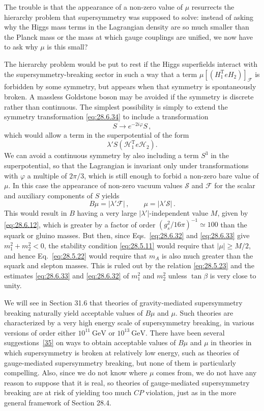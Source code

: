 The trouble is that the appearance of a non-zero value of \(\mu\)
resurrects the hierarchy problem that supersymmetry was supposed to solve:
instead of asking why the Higgs mass terms in the Lagrangian density are
so much smaller than the Planck mass or the mass at which gauge couplings
are unified, we now have to ask why \(\mu\) is this small?

The hierarchy problem would be put to rest if the Higgs superfields
interact with the supersymmetry-breaking sector in such a way that a term
\(\mu[(H_1^{\mathrm{T}}eH_2)]_{\mathcal{F}}\) is forbidden by some
symmetry, but appears when that symmetry is spontaneously broken. A
massless Goldstone boson may be avoided if the symmetry is discrete rather
than continuous. The simplest possibility is simply to extend the
symmetry transformation \eqref{eq:28.6.34} to include a transformation
\[
  S\longrightarrow e^{-2i\varphi}S\,,
\]
which would allow a term in the superpotential of the form
\[
  \lambda'S(\mathcal{H}_1^{\mathrm{T}}e\mathcal{H}_2).
\]
We can avoid a continuous symmetry by also including a term \(S^3\) in
the superpotential, so that the Lagrangian is invariant only under
transformations with \(\varphi\) a multiple of \(2\pi/3\), which is still
enough to forbid a non-zero bare value of \(\mu\). In this case the
appearance of non-zero vacuum values \(\mathcal{S}\) and \(\mathcal{F}\)
for the scalar and auxiliary components of \(S\) yields
\[
  B\mu=\lvert\lambda'\mathcal{F}\rvert\,,
  \qquad
  \mu=\lvert\lambda'\mathcal{S}\rvert\,.
\]
This would result in \(B\) having a very large
\(\lvert\lambda'\rvert\)-independent value \(M\), given by
\eqref{eq:28.6.12}, which is greater by a factor of order
\((g_s^2/16\pi)^{-1}\simeq100\) than the squark or gluino masses. But
then, since Eqs.~\eqref{eq:28.6.32} and \eqref{eq:28.6.33} give
\(m_1^2+m_2^2<0\), the stability condition \eqref{eq:28.5.11} would
require that \(\lvert\mu\rvert\geq M/2\), and hence
Eq.~\eqref{eq:28.5.22} would require that \(m_A\) is also much greater
than the squark and slepton masses. This is ruled out by the relation
\eqref{eq:28.5.23} and the estimates \eqref{eq:28.6.33} and
\eqref{eq:28.6.32} of \(m_1^2\) and \(m_2^2\) unless \(\tan\beta\) is
very close to unity.

We will see in Section 31.6 that theories of gravity-mediated
supersymmetry breaking naturally yield acceptable values of \(B\mu\) and
\(\mu\). Such theories are characterized by a very high energy scale of
supersymmetry breaking, in various versions of order either
\(10^{11}\ \mathrm{GeV}\) or \(10^{13}\ \mathrm{GeV}\). There have been
several suggestions~\hyperref[ch28-ref-35]{[35]} on ways to obtain
acceptable values of \(B\mu\) and \(\mu\) in theories in which
supersymmetry is broken at relatively low energy, such as theories of
gauge-mediated supersymmetry breaking, but none of them is particularly
compelling. Also, since we do not know where \(\mu\) comes from, we do not
have any reason to suppose that it is real, so theories of gauge-mediated
supersymmetry breaking are at risk of yielding too much \(CP\) violation,
just as in the more general framework of Section 28.4.

